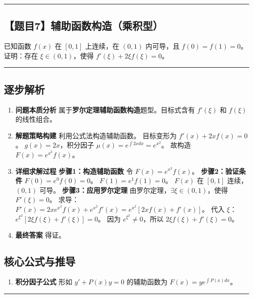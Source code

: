 \documentclass[UTF8]{ctexart}
\newenvironment{redenv}{\color{red}}{}
\newenvironment{detailedanalysis}{%
    \color{red}
    \begin{enumerate}[label=\textbf{第\arabic*步：}, leftmargin=*, align=left, itemsep=1.5ex]
}{%
    \end{enumerate}
}
\newenvironment{formuladerivation}{%
    \begin{enumerate}[label={\textbf{公式\arabic*：}}, leftmargin=*, align=left]
}{%
    \end{enumerate}
}
\newcommand{\problemrule}{\noindent\rule{\textwidth}{1.5pt}\vspace{-0.8em}}
\newcommand{\analysisrule}{\noindent\rule{\textwidth}{0.8pt}\vspace{-0.8em}}
\begin{document}
\vspace{2em}
\problemrule
\subsection*{【题目7】辅助函数构造（乘积型）}
已知函数 $f(x)$ 在 $[0, 1]$ 上连续，在 $(0, 1)$ 内可导，且 $f(0)=f(1)=0$。证明：存在 $\xi \in (0, 1)$，使得 $f'(\xi) + 2\xi f(\xi) = 0$。

\begin{redenv}
\analysisrule
\subsection*{逐步解析}

\begin{detailedanalysis}
\item \textbf{问题本质分析}
属于\textbf{罗尔定理辅助函数构造}题型。目标式含有 $f'(\xi)$ 和 $f(\xi)$ 的线性组合。

\item \textbf{解题策略构建}
利用公式法构造辅助函数。
目标变形为 $f'(x) + 2x f(x) = 0$。
$g(x) = 2x$，积分因子 $\mu(x) = e^{\int 2x dx} = e^{x^2}$。
故构造 $F(x) = e^{x^2}f(x)$。

\item \textbf{详细求解过程}
\noindent\textbf{步骤1：构造辅助函数}
令 $F(x) = e^{x^2}f(x)$。
\noindent\textbf{步骤2：验证条件}
$F(0) = e^0 f(0) = 0$。
$F(1) = e^1 f(1) = 0$。
$F(x)$ 在 $[0, 1]$ 连续，$(0, 1)$ 可导。
\noindent\textbf{步骤3：应用罗尔定理}
由罗尔定理，$\exists \xi \in (0, 1)$，使得 $F'(\xi) = 0$。
求导：$F'(x) = 2x e^{x^2} f(x) + e^{x^2} f'(x) = e^{x^2}[2x f(x) + f'(x)]$。
代入 $\xi$：$e^{\xi^2}[2\xi f(\xi) + f'(\xi)] = 0$。
因为 $e^{\xi^2} \neq 0$，所以 $2\xi f(\xi) + f'(\xi) = 0$。

\item \textbf{最终答案}
得证。
\end{detailedanalysis}

\subsection*{核心公式与推导}
\begin{formuladerivation}
\item \textbf{积分因子公式}
形如 $y' + P(x)y = 0$ 的辅助函数为 $F(x) = y e^{\int P(x)dx}$。
\end{formuladerivation}
\end{redenv}

\vspace{2em}
\problemrule
\end{document}

